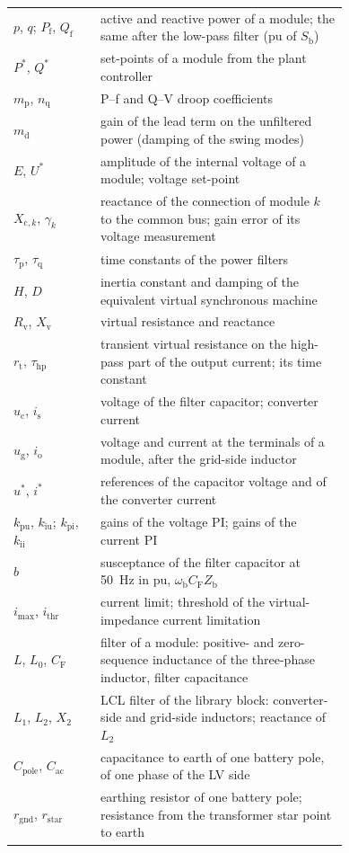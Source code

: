 \documentclass[11pt,a4paper]{scrartcl}
\newcommand{\ped}[1]{_{\mathrm{#1}}}
\begin{document}
\begin{onehalfspace}
\begin{longtable}{@{} l p{0.74\linewidth} @{}}
	$p$, $q$; $P\ped{f}$, $Q\ped{f}$ & active and reactive power of a module; the same after the low-pass filter (pu of $S\ped{b}$) \\
	$P^*$, $Q^*$ & set-points of a module from the plant controller \\
	$m\ped{p}$, $n\ped{q}$ & P--f and Q--V droop coefficients \\
	$m\ped{d}$ & gain of the lead term on the unfiltered power (damping of the swing modes) \\
	$E$, $U^*$ & amplitude of the internal voltage of a module; voltage set-point \\
	$X\ped{c,\mathit{k}}$, $\gamma_k$ & reactance of the connection of module $k$ to the common bus; gain error of its voltage measurement \\
	$\tau\ped{p}$, $\tau\ped{q}$ & time constants of the power filters \\
	$H$, $D$ & inertia constant and damping of the equivalent virtual synchronous machine \\
	$R\ped{v}$, $X\ped{v}$ & virtual resistance and reactance \\
	$r\ped{t}$, $\tau\ped{hp}$ & transient virtual resistance on the high-pass part of the output current; its time constant \\
	$u\ped{c}$, $i\ped{s}$ & voltage of the filter capacitor; converter current \\
	$u\ped{g}$, $i\ped{o}$ & voltage and current at the terminals of a module, after the grid-side inductor \\
	$u^*$, $i^*$ & references of the capacitor voltage and of the converter current \\
	$k\ped{pu}$, $k\ped{iu}$; $k\ped{pi}$, $k\ped{ii}$ & gains of the voltage PI; gains of the current PI \\
	$b$ & susceptance of the filter capacitor at \SI{50}{Hz} in pu, $\omega\ped{b} C\ped{F} Z\ped{b}$ \\
	$i\ped{max}$, $i\ped{thr}$ & current limit; threshold of the virtual-impedance current limitation \\
	$L$, $L_0$, $C\ped{F}$ & filter of a module: positive- and zero-sequence inductance of the three-phase inductor, filter capacitance \\
	$L_1$, $L_2$, $X_2$ & LCL filter of the library block: converter-side and grid-side inductors; reactance of $L_2$ \\
	$C\ped{pole}$, $C\ped{ac}$ & capacitance to earth of one battery pole, of one phase of the LV side \\
	$r\ped{gnd}$, $r\ped{star}$ & earthing resistor of one battery pole; resistance from the transformer star point to earth \\
\end{longtable}
\endgroup
\addtocounter{table}{-1}


\end{onehalfspace}
\end{document}

